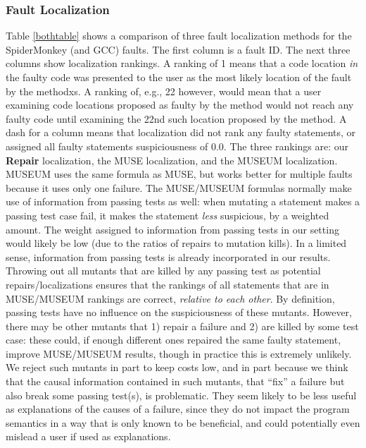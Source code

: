 \subsubsection{Fault Localization}

Table \ref{bothtable} shows a comparison of three fault localization methods for the SpiderMonkey (and GCC) faults.  The first column is a fault ID. The next three columns show localization rankings.  A ranking of 1 means that a code location \emph{in} the faulty code was presented to the user as the most likely location of the fault by the methodxs.  A ranking of, e.g., 22 however, would mean that a user examining code locations proposed as faulty by the method would not reach any faulty code until examining the 22nd such location proposed by the method.  A dash for a column means that localization did not rank any faulty statements, or assigned all faulty statements suspiciousness of 0.0.  The three rankings are: our {\bf Repair} localization, the MUSE \cite{MUSE} localization, and the MUSEUM \cite{multilingual} localization.  MUSEUM uses the same formula as MUSE, but works better for multiple faults because it uses only one failure.  The MUSE/MUSEUM formulas normally make use of information from passing tests as well: when mutating a statement makes a passing test case fail, it makes the statement \emph{less} suspicious, by a weighted amount. The weight assigned to information from passing tests in our setting would likely be low (due to the ratios of repairs to mutation kills).  In a limited sense, information from passing tests is already incorporated in our results.  Throwing out all mutants that are killed by any passing test as potential repairs/localizations ensures that the rankings of all statements that are in MUSE/MUSEUM rankings are correct, \emph{relative to each other}.  By definition, passing tests have no influence on the suspiciousness of these mutants.  However, there may be other mutants that 1) repair a failure and 2) are killed by some test case: these could, if enough different ones repaired the same faulty statement, improve MUSE/MUSEUM results, though in practice this is extremely unlikely.  We reject such mutants in part to keep costs low, and in part because we think that the causal information contained in such mutants, that ``fix'' a failure but also break some passing test(s), is problematic.  They seem likely to be less useful as explanations of the causes of a failure, since they do not impact the program semantics in a way that is only known to be beneficial, and could potentially even mislead a user if used as explanations.

